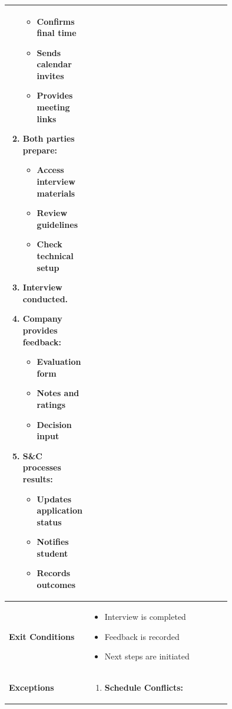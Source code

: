 \begin{center}
\begin{longtable}{|l|p{0.75\linewidth}|}
\begin{enumerate}
            \begin{itemize}
                \item Confirms final time
                \item Sends calendar invites
                \item Provides meeting links
            \end{itemize}
            \item Both parties prepare:
            \begin{itemize}
                \item Access interview materials
                \item Review guidelines
                \item Check technical setup
            \end{itemize}
            \item Interview conducted.
            \item Company provides feedback:
            \begin{itemize}
                \item Evaluation form
                \item Notes and ratings
                \item Decision input
            \end{itemize}
            \item S\&C processes results:
            \begin{itemize}
                \item Updates application status
                \item Notifies student
                \item Records outcomes
            \end{itemize}
        \end{enumerate} \\
        \hline
        \textbf{Exit Conditions}   & 
        \begin{itemize}
            \item Interview is completed
            \item Feedback is recorded
            \item Next steps are initiated
        \end{itemize} \\
        \hline
        \textbf{Exceptions}       & 
        \begin{enumerate}
            \item \textbf{Schedule Conflicts:}

\end{enumerate}
\end{longtable}
\end{center}
